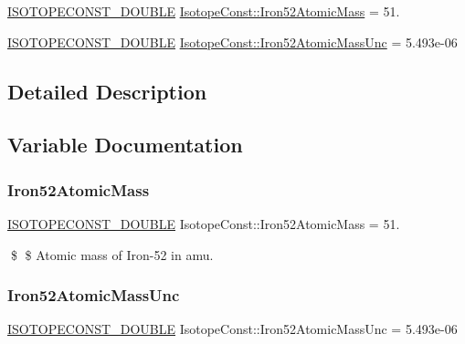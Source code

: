 \begin{DoxyCompactItemize}
\item 
\mbox{\hyperlink{group___isotope_const-_macros_ga8f45a7272ce02c0b4c65c44636ed719a}{I\+S\+O\+T\+O\+P\+E\+C\+O\+N\+S\+T\+\_\+\+D\+O\+U\+B\+LE}} \mbox{\hyperlink{group___isotope_const-_iron-_fe52_gad3d19f9660d580e7237612e7911a2b36}{Isotope\+Const\+::\+Iron52\+Atomic\+Mass}} = 51.
\item 
\mbox{\hyperlink{group___isotope_const-_macros_ga8f45a7272ce02c0b4c65c44636ed719a}{I\+S\+O\+T\+O\+P\+E\+C\+O\+N\+S\+T\+\_\+\+D\+O\+U\+B\+LE}} \mbox{\hyperlink{group___isotope_const-_iron-_fe52_ga6cc983be2905fd31fd501b5e25fdccda}{Isotope\+Const\+::\+Iron52\+Atomic\+Mass\+Unc}} = 5.\+493e-\/06
\end{DoxyCompactItemize}


\subsection{Detailed Description}


\subsection{Variable Documentation}
\mbox{\label{group___isotope_const-_iron-_fe52_gad3d19f9660d580e7237612e7911a2b36}} 
\subsubsection{\texorpdfstring{Iron52\+Atomic\+Mass}{Iron52AtomicMass}}
{\footnotesize\ttfamily \mbox{\hyperlink{group___isotope_const-_macros_ga8f45a7272ce02c0b4c65c44636ed719a}{I\+S\+O\+T\+O\+P\+E\+C\+O\+N\+S\+T\+\_\+\+D\+O\+U\+B\+LE}} Isotope\+Const\+::\+Iron52\+Atomic\+Mass = 51.}

\$ \$ Atomic mass of Iron-\/52 in amu. \mbox{\label{group___isotope_const-_iron-_fe52_ga6cc983be2905fd31fd501b5e25fdccda}} 
\subsubsection{\texorpdfstring{Iron52\+Atomic\+Mass\+Unc}{Iron52AtomicMassUnc}}
{\footnotesize\ttfamily \mbox{\hyperlink{group___isotope_const-_macros_ga8f45a7272ce02c0b4c65c44636ed719a}{I\+S\+O\+T\+O\+P\+E\+C\+O\+N\+S\+T\+\_\+\+D\+O\+U\+B\+LE}} Isotope\+Const\+::\+Iron52\+Atomic\+Mass\+Unc = 5.\+493e-\/06}

